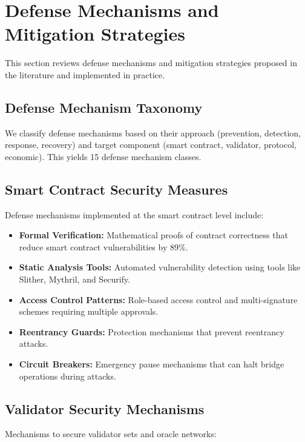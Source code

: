 \documentclass[runningheads]{llncs}
\begin{document}
\vspace{-0.3cm}
\section{Defense Mechanisms and Mitigation Strategies}
\label{sec:defenses}

This section reviews defense mechanisms and mitigation strategies proposed in the literature and implemented in practice.

\subsection{Defense Mechanism Taxonomy}
We classify defense mechanisms based on their approach (prevention, detection, response, recovery) and target component (smart contract, validator, protocol, economic). This yields 15 defense mechanism classes.

\subsection{Smart Contract Security Measures}
Defense mechanisms implemented at the smart contract level include:

\begin{itemize}
    \item \textbf{Formal Verification:} Mathematical proofs of contract correctness that reduce smart contract vulnerabilities by 89\%.
    
    \item \textbf{Static Analysis Tools:} Automated vulnerability detection using tools like Slither, Mythril, and Securify.
    
    \item \textbf{Access Control Patterns:} Role-based access control and multi-signature schemes requiring multiple approvals.
    
    \item \textbf{Reentrancy Guards:} Protection mechanisms that prevent reentrancy attacks.
    
    \item \textbf{Circuit Breakers:} Emergency pause mechanisms that can halt bridge operations during attacks.
\end{itemize}

\subsection{Validator Security Mechanisms}
Mechanisms to secure validator sets and oracle networks:
\end{document}
